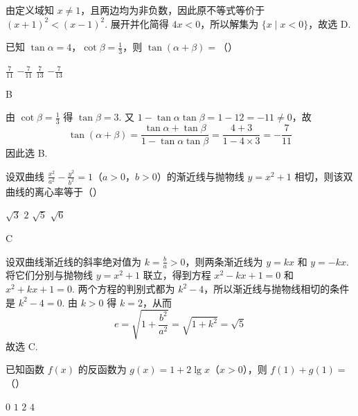 \begin{solution}
由定义域知 \(x\neq1\)，且两边均为非负数，因此原不等式等价于 \((x+1)^2<(x-1)^2\). 展开并化简得 \(4x<0\)，所以解集为 \(\{x\mid x<0\}\)，故选 D.
\end{solution}

\begin{problem}
已知 \(\tan \alpha = 4\)，\(\cot \beta = \frac{1}{3}\)，则 \(\tan (\alpha + \beta) =\)（\quad）

\choices
    {\(\frac{7}{11}\)}
    {\(-\frac{7}{11}\)}
    {\(\frac{7}{13}\)}
    {\(-\frac{7}{13}\)}
\end{problem}

\begin{answer}
B
\end{answer}

\begin{solution}
由 \(\cot\beta=\frac{1}{3}\) 得 \(\tan\beta=3\). 又 \(1-\tan\alpha\tan\beta=1-12=-11\neq0\)，故
\[
\tan(\alpha+\beta)=\frac{\tan\alpha+\tan\beta}{1-\tan\alpha\tan\beta}=\frac{4+3}{1-4\times3}=-\frac{7}{11}
\]
因此选 B.
\end{solution}

\begin{problem}
设双曲线 \(\frac{x^2}{a^2} - \frac{y^2}{b^2} = 1\)（\(a > 0\)，\(b > 0\)）的渐近线与抛物线 \(y = x^2 + 1\) 相切，则该双曲线的离心率等于（\quad）

\choices
    {\(\sqrt{3}\)}
    {\(2\)}
    {\(\sqrt{5}\)}
    {\(\sqrt{6}\)}
\end{problem}

\begin{answer}
C
\end{answer}

\begin{solution}
设双曲线渐近线的斜率绝对值为 \(k=\frac{b}{a}>0\)，则两条渐近线为 \(y=kx\) 和 \(y=-kx\). 将它们分别与抛物线 \(y=x^2+1\) 联立，得到方程 \(x^2-kx+1=0\) 和 \(x^2+kx+1=0\). 两个方程的判别式都为 \(k^2-4\)，所以渐近线与抛物线相切的条件是 \(k^2-4=0\). 由 \(k>0\) 得 \(k=2\)，从而
\[
e=\sqrt{1+\frac{b^2}{a^2}}=\sqrt{1+k^2}=\sqrt{5}
\]
故选 C.
\end{solution}

\begin{problem}
已知函数 \( f(x) \) 的反函数为 \( g(x) = 1 + 2\lg x \)（\(x > 0\)），则 \( f(1) + g(1) = \)（\quad）

\choices
    {\(0\)}
    {\(1\)}
    {\(2\)}
    {\(4\)}
\end{problem}

